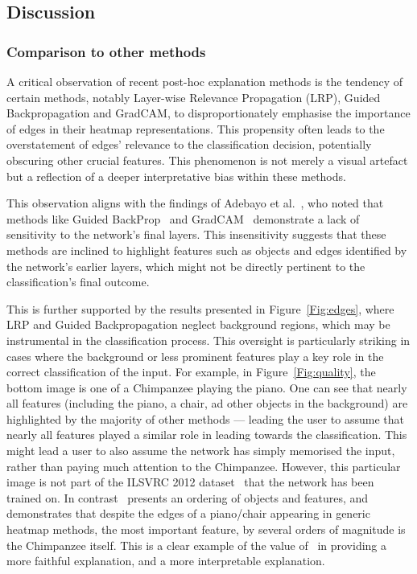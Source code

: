 \subsection{Discussion}

\subsubsection{Comparison to other methods}

A critical observation of recent post-hoc explanation methods is the tendency of certain methods, notably Layer-wise Relevance Propagation (LRP), Guided Backpropagation and GradCAM, to disproportionately emphasise the importance of edges in their heatmap representations. This propensity often leads to the overstatement of edges' relevance to the classification decision, potentially obscuring other crucial features. This phenomenon is not merely a visual artefact but a reflection of a deeper interpretative bias within these methods.

This observation aligns with the findings of Adebayo et al.~\cite{AdebayoGMGHK18}, who noted that methods like Guided BackProp~\cite{SpringenbergDBR14} and GradCAM~\cite{ShrikumarGK17} demonstrate a lack of sensitivity to the network's final layers. This insensitivity suggests that these methods are inclined to highlight features such as objects and edges identified by the network's earlier layers, which might not be directly pertinent to the classification's final outcome. 

This is further supported by the results presented in Figure~\ref{Fig:edges}, where LRP and Guided Backpropagation neglect background regions, which may be instrumental in the classification process. This oversight is particularly striking in cases where the background or less prominent features play a key role in the correct classification of the input. For example, in Figure~\ref{Fig:quality}, the bottom image is one of a Chimpanzee playing the piano. One can see that nearly all features (including the piano, a chair, ad other objects in the background) are highlighted by the majority of other methods --- leading the user to assume that nearly all features played a similar role in leading towards the classification. This might lead a user to also assume the network has simply memorised the input, rather than paying much attention to the Chimpanzee. However, this particular image is not part of the ILSVRC 2012 dataset~\cite{ILSVRC15} that the network has been trained on. In contrast \CTC\ presents an ordering of objects and features, and demonstrates that despite the edges of a piano/chair appearing in generic heatmap methods, the most important feature, by several orders of magnitude is the Chimpanzee itself. This is a clear example of the value of \CTC\ in providing a more faithful explanation, and a more interpretable explanation.

